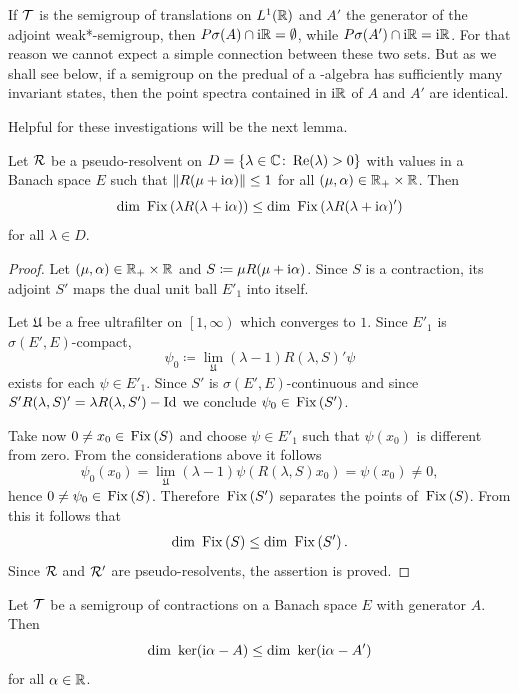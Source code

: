 If\/ $\mathcal{T}$ is the semigroup of translations on $L^1(\mathbb{R})$ and $A'$ the generator 
of the adjoint weak*-semigroup, then $P\sigma(A) \cap \mathrm{i}\mathbb{R} = \emptyset$, while $P{\sigma}(A') \cap \mathrm{i}\mathbb{R} = \mathrm{i}\mathbb{R}$.
For that reason we cannot expect a simple connection between these two sets.
But as we shall see below, if a semigroup on the predual of a \WA-algebra has sufficiently many invariant states, then the point spectra contained in $\mathrm{i}\mathbb{R}$ of\/ $A$ and $A'$  are identical.

Helpful for these investigations will be the next lemma.
\begin{lemma}\label{lem:d3-1.6}
Let $\mathcal{R}$ be a pseudo-resolvent on $D = \{\lambda \in \mathbb{C} \colon \mathop{}\!\mathrm{Re}(\lambda) > 0\}$ with values in a Banach space $E$ such that $\|R(\mu + \im\alpha)\| \leq 1$ for all $(\mu,\alpha) \in \mathbb{R}_{+} \times \mathbb{R}$.
Then
\[
\dim \Fix{\lambda R(\lambda + \im\alpha)} \leq \dim \Fix{\lambda R(\lambda + \im\alpha)'} 
\]
for all $\lambda \in D$.
\end{lemma}
\begin{proof}
Let $(\mu,\alpha) \in \mathbb{R}_{+} \times \mathbb{R}$ and $S \coloneq \mu R(\mu + \mathrm{i}\alpha)$.
Since $S$ is a contraction, its adjoint $S'$ maps the dual unit ball $E'_{1}$ into itself.

Let $\mathfrak{U}$ be a free ultrafilter on $ \left[1,\infty \right)$ which converges to $1$.
Since $E'_{1}$ is $\sigma(E',E)$-compact, 
\[
\psi_{0} \coloneq \lim_{\mathfrak{U}}(\lambda - 1)R(\lambda,S)'\psi
\]
exists for each $\psi \in E'_{1}$.
Since $S'$ is $\sigma(E',E)$-continuous and since $S'R(\lambda,S)' = \lambda R(\lambda,S')-\operatorname{Id}$ we conclude $\psi_{0} \in \mathop{}\mathrm{Fix}\left(S'\right)$.

Take now $0 \neq x_{0} \in \mathop{}\mathrm{Fix}\left(S\right)$ and choose $\psi \in E'_{1}$ such that $\psi(x_{0})$ is different from zero.
From the considerations above it follows
\[ 
\psi_{0}(x_{0}) = \lim_{\mathfrak{U}}(\lambda - 1)\psi(R(\lambda,S)x_{0}) = \psi(x_{0}) \neq 0 ,
\]
hence $0 \neq \psi_{0} \in \mathop{}\mathrm{Fix}\left(S\right)$.
Therefore $\mathop{}\mathrm{Fix}\left(S'\right)$ separates the points of\/ $\mathop{}\mathrm{Fix}\left(S\right)$.
From this it follows that
\[
	\dim \Fix{S} \leq \dim \Fix{S'} .
\]
Since $\mathcal{R}$ and $\mathcal{R}'$ are pseudo-resolvents, the assertion is proved.
\end{proof}
\begin{corollary}\label{cor:d3-1.7}
Let $\mathcal{T}$ be a semigroup of contractions on a Banach space $E$ with generator $A$.
Then
\[
\dim \Kern{\im\alpha - A} \leq \dim \Kern{\im\alpha - A'}
\]
for all $\alpha \in \mathbb{R}$.
\end{corollary}
